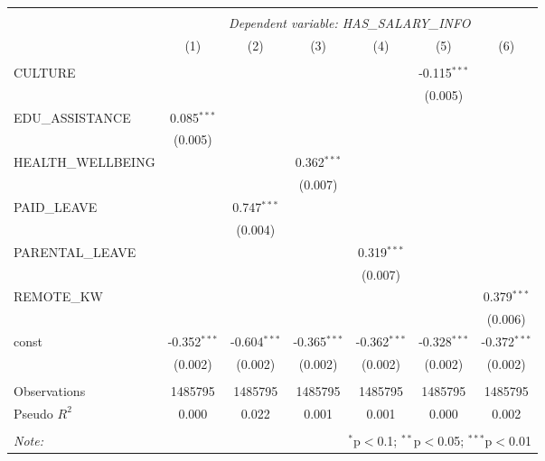 \begin{table}[!htbp] \centering
\begin{tabular}{@{\extracolsep{5pt}}lcccccc}
\\[-1.8ex]\hline
\hline \\[-1.8ex]
& \multicolumn{6}{c}{\textit{Dependent variable: HAS_SALARY_INFO}} \
\cr \cline{2-7}
\\[-1.8ex] & (1) & (2) & (3) & (4) & (5) & (6) \\
\hline \\[-1.8ex]
 CULTURE & & & & & -0.115$^{***}$ & \\
& & & & & (0.005) & \\
 EDU_ASSISTANCE & 0.085$^{***}$ & & & & & \\
& (0.005) & & & & & \\
 HEALTH_WELLBEING & & & 0.362$^{***}$ & & & \\
& & & (0.007) & & & \\
 PAID_LEAVE & & 0.747$^{***}$ & & & & \\
& & (0.004) & & & & \\
 PARENTAL_LEAVE & & & & 0.319$^{***}$ & & \\
& & & & (0.007) & & \\
 REMOTE_KW & & & & & & 0.379$^{***}$ \\
& & & & & & (0.006) \\
 const & -0.352$^{***}$ & -0.604$^{***}$ & -0.365$^{***}$ & -0.362$^{***}$ & -0.328$^{***}$ & -0.372$^{***}$ \\
& (0.002) & (0.002) & (0.002) & (0.002) & (0.002) & (0.002) \\
\hline \\[-1.8ex]
 Observations & 1485795 & 1485795 & 1485795 & 1485795 & 1485795 & 1485795 \\
 Pseudo $R^2$ & 0.000 & 0.022 & 0.001 & 0.001 & 0.000 & 0.002 \\
\hline
\hline \\[-1.8ex]
\textit{Note:} & \multicolumn{6}{r}{$^{*}$p$<$0.1; $^{**}$p$<$0.05; $^{***}$p$<$0.01} \\
\end{tabular}
\end{table}